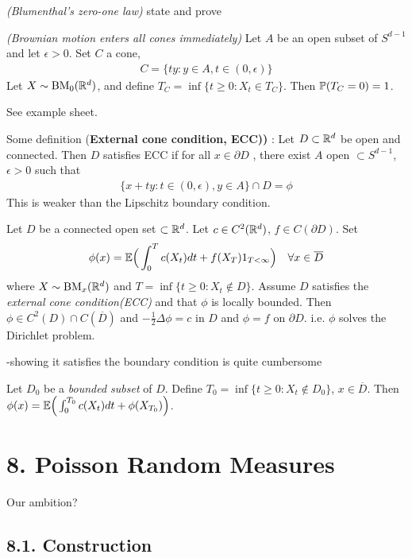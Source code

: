 \documentclass[10pt,a4paper]{report}
\newenvironment{proof}
{\begin{changemargin}{1cm}{0.5cm} 
	}%
	{\end{changemargin}
}
\begin{document}
 \emph{(Blumenthal's zero-one law)} state and prove
\s

 \emph{(Brownian motion enters all cones immediately)} Let $A$ be an open subset of $S^{d-1}$ and let $\epsilon>0$. Set $C$ a cone,
\begin{align*}
C = \{ty : y\in A, t\in (0,\epsilon) \}
\end{align*} 
Let $X \sim \text{BM}_0(\mathbb{R}^d)$, and define $T_C = \inf \{ t\geq 0: X_t \in T_C \}$. Then $\mathbb{P}(T_C =0)=1$. 
\begin{proof}
See example sheet.
\end{proof}
\s

Some definition (\textbf{External cone condition, ECC))} : Let $D \subset \mathbb{R}^d$ be open and connected. Then $D$ satisfies ECC if for all $x\in \partial D$ , there exist $A$ open $\subset S^{d-1}$, $\epsilon >0$ such that
\begin{align*}
\{x+ty : t\in (0,\epsilon), y\in A \} \cap D = \phi
\end{align*}
This is weaker than the Lipschitz boundary condition.

\s
{} Let $D$ be a connected open set $\subset \mathbb{R}^d$. Let $c\in C^2(\mathbb{R}^d)$, $f\in C(\partial D)$. Set
\begin{align*}
\phi(x) = \mathbb{E} \Big( \int_0^T c(X_t) dt + f(X_T) 1_{T<\infty} \Big) \quad \forall x\in \overline{D}
\end{align*}
where $X \sim \text{BM}_x(\mathbb{R}^d)$ and $T = \inf \{ t\geq 0: X_t \not\in D \}$. Assume $D$ satisfies the \emph{external cone condition(ECC)} and that $\phi$ is locally bounded. Then $\phi \in C^2(D) \cap C(\overline{D})$ and $-\frac{1}{2}\Delta \phi =c$ in $D$ and $\phi =f$ on $\partial D$. i.e. $\phi$ solves the Dirichlet problem.

-showing it satisfies the boundary condition is quite cumbersome
\s

 Let $D_0$ be a \emph{bounded subset} of $D$. Define $T_0 = \inf \{t\geq 0: X_t \not\in D_0 \}$, $x\in \overline{D}$. Then $\phi(x) = \mathbb{E} \Big( \int_0^{T_0} c(X_t) dt + \phi(X_{T_{0}}) \Big)$.
\s

\section*{8. Poisson Random Measures}

Our ambition?

\subsection*{8.1. Construction}
\end{document}
